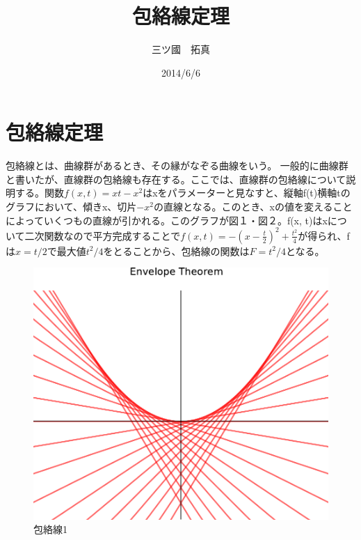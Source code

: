 \documentclass[11pt,a4j,fleqn]{jarticle}
\title{包絡線定理}
\author{三ツ國　拓真}
\date{2014/6/6}
\begin{document}
\maketitle

\section{包絡線定理}

包絡線とは、曲線群があるとき、その縁がなぞる曲線をいう。
一般的に曲線群と書いたが、直線群の包絡線も存在する。ここでは、直線群の包絡線について説明する。関数$f(x, t) = x t - x^2 $はxをパラメーターと見なすと、縦軸f(t)横軸tのグラフにおいて、傾きx、切片$- x^2$の直線となる。このとき、xの値を変えることによっていくつもの直線が引かれる。このグラフが図１・図２。f(x, t)はxについて二次関数なので平方完成することで$f(x, t) = -\left(x - \frac{t}{2}\right)^2 + \frac{t^2}{4} \label{eq:square-2}$が得られ、fは$x=t/2$で最大値$t^2/4$をとることから、包絡線の関数は$F=t^2/4$となる。




\begin{figure}
 \centering
 \includegraphics{envelope0.pdf}
 \caption{包絡線1}
 \label{fig:1}
\end{figure}
\end{document}
